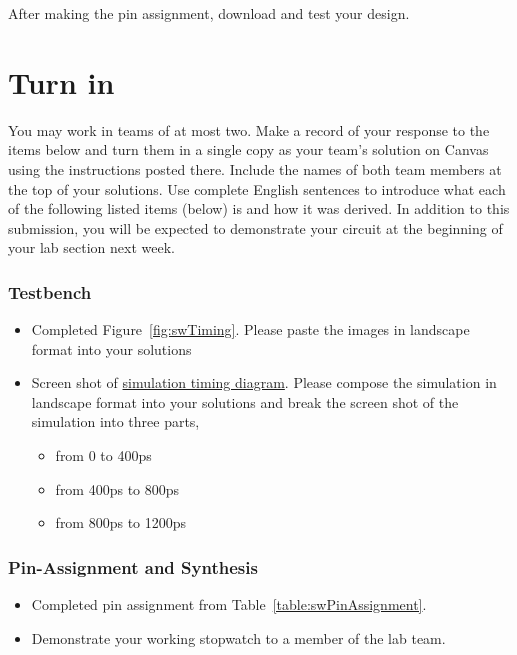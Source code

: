 After making the pin assignment, download and test your design.

\section{Turn in}

You may work in teams of at most two. Make a record of your response to
the items below and turn them in a single copy as your team's solution
on Canvas using the instructions posted there. Include the names of both
team members at the top of your solutions. Use complete English
sentences to introduce what each of the following listed items (below)
is and how it was derived. In addition to this submission, you will be
expected to demonstrate your circuit at the beginning of your lab
section next week.

\subsubsection{Testbench}

\begin{itemize}
\item
  Completed Figure~\ref{fig:swTiming}. Please paste the images in landscape format into your solutions

\item
  Screen shot of \hyperlink{link:swTestbench}{simulation timing diagram}. Please compose the simulation in landscape 
  format into your solutions and break the screen shot of the simulation into three parts,

  \begin{itemize}
    \item
      from 0 to 400ps
    \item
      from 400ps to 800ps
    \item
      from 800ps to 1200ps
\end{itemize}
\end{itemize}

\subsubsection{Pin-Assignment and Synthesis}

\begin{itemize}
\item
  Completed pin assignment from Table~\ref{table:swPinAssignment}.
\item
  Demonstrate your working stopwatch to a member of the lab team.
\end{itemize}
